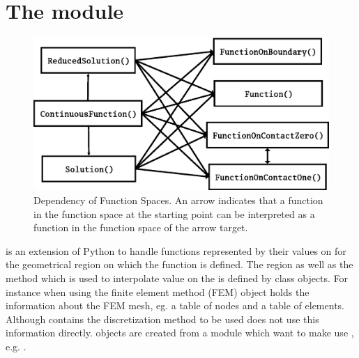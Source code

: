 %
%


\chapter{The module \escript}


\begin{figure}
\includegraphics[width=\textwidth]{figures/EscriptDiagram1.eps}
\caption{\label{ESCRIPT DEP}Dependency of Function Spaces. An arrow indicates that a function in the 
function space at the starting point can be interpreted as a function in the function space of the arrow target.}
\end{figure}

\escript is an extension of Python to handle functions represented by their values on
\DataSamplePoints for the geometrical region on which
the function is defined. The region as well as the method which is used 
to interpolate value on the \DataSamplePoints is defined by     
\Domain class objects. For instance when using 
the finite element method (FEM)  
\Domain object holds the information about the FEM mesh, eg. 
a table of nodes and a table of elements. Although \Domain contains
the discretization method to be used \escript does not use this information directly.
\Domain objects are created from a module which want to make use 
\escript, e.g. \finley.

